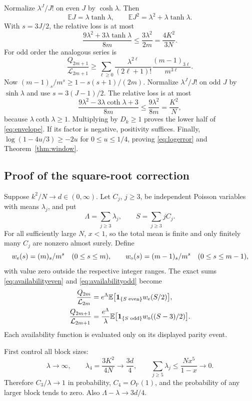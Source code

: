 \documentclass[11pt]{article}
\theoremstyle{definition}
\theoremstyle{remark}
\newcommand{\E}{\mathbb E}
\newcommand{\PP}{\mathbb P}
\newcommand{\1}{\mathbf 1}
\begin{document}
Normalize $\lambda^J/J!$ on even $J$ by $\cosh\lambda$. Then
\[
\E J=\lambda\tanh\lambda,\qquad
\E J^2=\lambda^2+\lambda\tanh\lambda.
\]
With $s=3J/2$, the relative loss is at most
\[
\frac{9\lambda^2+3\lambda\tanh\lambda}{8m}
\le\frac{3\lambda^2}{2m}=\frac{4K^2}{3N}.
\]
For odd order the analogous series is
\[
\frac{Q_{2m+1}}{\mathcal L_{2m+1}}
\ge\sum_{\ell\ge0}\frac{\lambda^{2\ell}}{(2\ell+1)!}
\frac{(m-1)_{3\ell}}{m^{3\ell}}.
\]
Now $(m-1)_s/m^s\ge1-s(s+1)/(2m)$. Normalize $\lambda^J/J!$ on odd $J$ by $\sinh\lambda$ and use $s=3(J-1)/2$. The relative loss is at most
\[
\frac{9\lambda^2-3\lambda\coth\lambda+3}{8m}
\le\frac{9\lambda^2}{8m}=\frac{K^2}N,
\]
because $\lambda\coth\lambda\ge1$. Multiplying by $D_k\ge1$ proves the lower half of \eqref{eq:envelope}. If its factor is negative, positivity suffices. Finally, $\log(1-4u/3)\ge-2u$ for $0\le u\le1/4$, proving \eqref{eq:logerror} and Theorem~\ref{thm:window}.

\subsection{Proof of the square-root correction}

Suppose $k^2/N\to d\in(0,\infty)$. Let $C_j$, $j\ge3$, be independent Poisson variables with means $\lambda_j$, and put
\[
\Lambda=\sum_{j\ge3}\lambda_j,\qquad S=\sum_{j\ge3}jC_j.
\]
For all sufficiently large $N$, $x<1$, so the total mean is finite and only finitely many $C_j$ are nonzero almost surely. Define
\[
w_{\rm e}(s)=(m)_s/m^s\quad(0\le s\le m),\qquad
w_{\rm o}(s)=(m-1)_s/m^s\quad(0\le s\le m-1),
\]
with value zero outside the respective integer ranges. The exact sums \eqref{eq:availabilityeven} and \eqref{eq:availabilityodd} become
\begin{align}
\frac{Q_{2m}}{\mathcal L_{2m}}
&=e^\Lambda\E\bigl[\1_{\{S\text{ even}\}}w_{\rm e}(S/2)\bigr],\label{eq:poissoneven}\\
\frac{Q_{2m+1}}{\mathcal L_{2m+1}}
&=\frac{e^\Lambda}{\lambda}\E\bigl[\1_{\{S\text{ odd}\}}w_{\rm o}((S-3)/2)\bigr].\label{eq:poissonodd}
\end{align}
Each availability function is evaluated only on its displayed parity event.

First control all block sizes:
\[
\lambda\to\infty,\qquad
\lambda_4=\frac{3K^2}{4N}\to\frac{3d}4,\qquad
\sum_{j\ge5}\lambda_j\le\frac{Nx^5}{1-x}\to0.
\]
Therefore $C_3/\lambda\to1$ in probability, $C_4=O_{\PP}(1)$, and the probability of any larger block tends to zero. Also $\Lambda-\lambda\to3d/4$.
\end{document}

